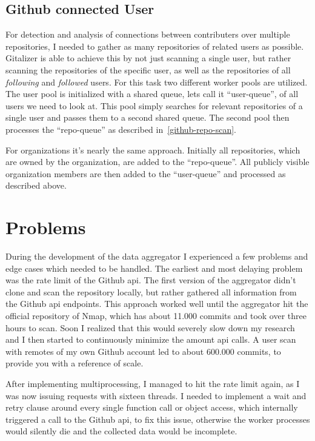 \subsection{Github connected User}\label{github-user-remote-scan}
For detection and analysis of connections between contributers over multiple repositories, I needed to gather as many repositories of related users as possible.
Gitalizer is able to achieve this by not just scanning a single user, but rather scanning the repositories of the specific user, as well as the repositories of all \emph{following} and \emph{followed} users.
For this task two different worker pools are utilized.
The user pool is initialized with a shared queue, lets call it ``user-queue'', of all users we need to look at.
This pool simply searches for relevant repositories of a single user and passes them to a second shared queue.
The second pool then processes the ``repo-queue'' as described in~\ref{github-repo-scan}.

For organizations it's nearly the same approach.
Initially all repositories, which are owned by the organization, are added to the ``repo-queue''.
All publicly visible organization members are then added to the ``user-queue'' and processed as described above.


\section{Problems}
During the development of the data aggregator I experienced a few problems and edge cases which needed to be handled.
The earliest and most delaying problem was the rate limit of the Github \ac{api}.
The first version of the aggregator didn't clone and scan the repository locally, but rather gathered all information from the Github \ac{api} endpoints.
This approach worked well until the aggregator hit the official repository of Nmap, which has about 11.000 commits and took over three hours to scan.
Soon I realized that this would severely slow down my research and I then started to continuously minimize the amount \ac{api} calls.
A user scan with remotes of my own Github account led to about 600.000 commits, to provide you with a reference of scale.

After implementing multiprocessing, I managed to hit the rate limit again, as I was now issuing requests with sixteen threads.
I needed to implement a wait and retry clause around every single function call or object access, which internally triggered a call to the Github \ac{api}, to fix this issue, otherwise the worker processes would silently die and the collected data would be incomplete.

